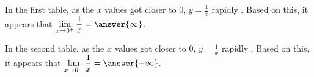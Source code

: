\documentclass{ximera}
\begin{document}
\begin{problem}
In the first table, as the $x$ values got closer to $0$, $y = \frac{1}{x}$ rapidly .  Based on this, it appears that $\displaystyle\lim_{x \to 0^+} \frac{1}{x} = \answer{\infty}$.

In the second table, as the $x$ values got closer to $0$, $y = \frac{1}{x}$ rapidly .  Based on this, it appears that $\displaystyle\lim_{x \to 0^-} \frac{1}{x} = \answer{-\infty}$.

\end{problem}


%
\end{document}
